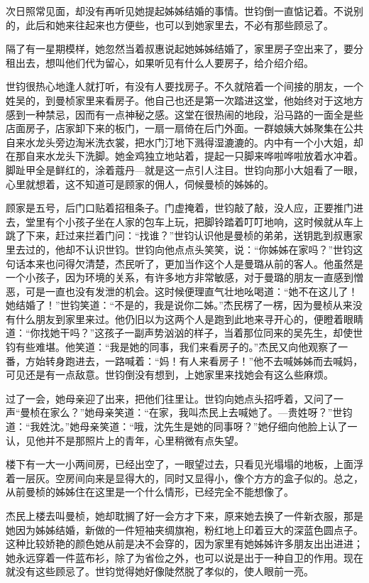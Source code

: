 \par 次日照常见面，却没有再听见她提起姊姊结婚的事情。世钧倒一直惦记着。不说别的，此后和她来往起来也方便些，也可以到她家里去，不必有那些顾忌了。
\par 隔了有一星期模样，她忽然当着叔惠说起她姊姊结婚了，家里房子空出来了，要分租出去，想叫他们代为留心，如果听见有什么人要房子，给介绍介绍。
\par 世钧很热心地逢人就打听，有没有人要找房子。不久就陪着一个间接的朋友，一个姓吴的，到曼桢家里来看房子。他自己也还是第一次踏进这堂，他始终对于这地方感到一种禁忌，因而有一点神秘之感。这堂在很热闹的地段，沿马路的一面全是些店面房子，店家卸下来的板门，一扇一扇倚在后门外面。一群娘姨大姊聚集在公共自来水龙头旁边淘米洗衣裳，把水门汀地下溅得湿漉漉的。内中有一个小大姐，却在那自来水龙头下洗脚。她金鸡独立地站着，提起一只脚来哗啦哗啦放着水冲着。脚趾甲全是鲜红的，涂着蔻丹—就是这一点引人注目。世钧向那小大姐看了一眼，心里就想着，这不知道可是顾家的佣人，伺候曼桢的姊姊的。
\par 顾家是五号，后门口贴着招租条子。门虚掩着，世钧敲了敲，没人应，正要推门进去，堂里有个小孩子坐在人家的包车上玩，把脚铃踏着叮叮地响，这时候就从车上跳了下来，赶过来拦着门问：“找谁？”世钧认识他是曼桢的弟弟，送钥匙到叔惠家里去过的，他却不认识世钧。世钧向他点点头笑笑，说：“你姊姊在家吗？”世钧这句话本来也问得欠清楚，杰民听了，更加当作这个人是曼璐从前的客人。他虽然是一个小孩子，因为环境的关系，有许多地方非常敏感，对于曼璐的朋友一直感到憎恶，可是一直也没有发泄的机会。这时候便理直气壮地吆喝道：“她不在这儿了！她结婚了！”世钧笑道：“不是的，我是说你二姊。”杰民楞了一楞，因为曼桢从来没有什么朋友到家里来过。他仍旧以为这两个人是跑到此地来寻开心的，便瞪着眼睛道：“你找她干吗？”这孩子一副声势汹汹的样子，当着那位同来的吴先生，却使世钧有些难堪。他笑道：“我是她的同事，我们来看房子的。”杰民又向他观察了一番，方始转身跑进去，一路喊着：“妈！有人来看房子！”他不去喊姊姊而去喊妈，可见还是有一点敌意。世钧倒没有想到，上她家里来找她会有这么些麻烦。
\par 过了一会，她母亲迎了出来，把他们往里让。世钧向她点头招呼着，又问了一声“曼桢在家么？”她母亲笑道：“在家，我叫杰民上去喊她了。—贵姓呀？”世钧道：“我姓沈。”她母亲笑道：“哦，沈先生是她的同事呀？”她仔细向他脸上认了一认，见他并不是那照片上的青年，心里稍微有点失望。
\par 楼下有一大一小两间房，已经出空了，一眼望过去，只看见光塌塌的地板，上面浮着一层灰。空房间向来是显得大的，同时又显得小，像个方方的盒子似的。总之，从前曼桢的姊姊住在这里是一个什么情形，已经完全不能想像了。
\par 杰民上楼去叫曼桢，她却耽搁了好一会方才下来，原来她去换了一件新衣服，那是她因为姊姊结婚，新做的一件短袖夹绸旗袍，粉红地上印着豆大的深蓝色圆点子。这种比较娇艳的颜色她从前是决不会穿的，因为家里有她姊姊许多朋友出出进进；她永远穿着一件蓝布衫，除了为省俭之外，也可以说是出于一种自卫的作用。现在就没有这些顾忌了。世钧觉得她好像陡然脱了孝似的，使人眼前一亮。
